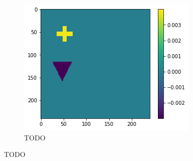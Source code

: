 \begin{figure}[H]
\begin{subfigure}[t]{.33\textwidth}
        \centering
        \includegraphics[width=\linewidth]{chapters/06_hdm/images_analyze/2c_diff.png}
        \caption{TODO}
    \end{subfigure}
    \caption{TODO}
\end{figure}

